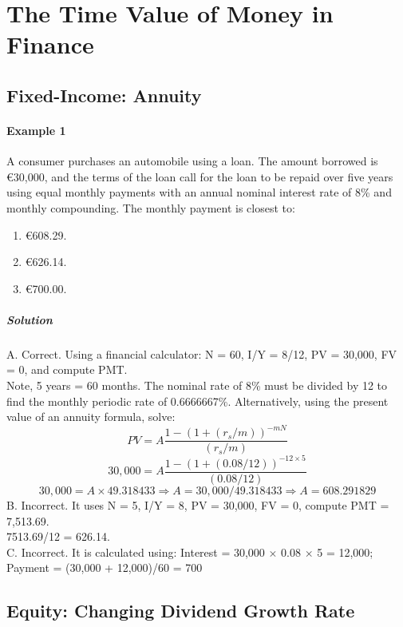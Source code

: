 \section{The Time Value of Money in Finance}
\label{sec:The Time Value of Money in Finance}
\subsection{Fixed-Income: Annuity} %
\paragraph{Example 1} %
A consumer purchases an automobile using a loan. The amount borrowed is €30,000, and the terms of the loan call for the loan to be repaid over five years using equal monthly payments with an annual nominal interest rate of 8\% and monthly compounding. The monthly payment is closest to:
\begin{enumerate}[label=\Alph*.]
	\item €608.29.
	\item €626.14.
	\item €700.00.
\end{enumerate}

\subparagraph{Solution} %
A. Correct. Using a financial calculator: N = 60, I/Y = 8/12, PV = 30,000, FV = 0, and compute PMT.\\
Note, 5 years = 60 months. The nominal rate of 8\% must be divided by 12 to find the monthly periodic rate of 0.6666667\%. Alternatively, using the present value of an annuity formula, solve:
\[
PV = A \frac{1 - (1 + (r_s/m))^{-mN}}{(r_s/m)}
\]
\[
30,000 = A \frac{1 - (1 + (0.08/12))^{-12 \times 5}}{(0.08/12)}
\]
\[30,000 = A \times 49.318433 \Rightarrow A = 30,000/49.318433 \Rightarrow A = 608.291829\]
B. Incorrect. It uses N = 5, I/Y = 8, PV = 30,000, FV = 0, compute PMT = 7,513.69.\\
7513.69/12 = 626.14.\\
C. Incorrect. It is calculated using: Interest = \texteuro{}30,000 $\times$ 0.08 $\times$ 5 = \texteuro{}12,000; Payment = (\texteuro{}30,000 + \texteuro{}12,000)/60 = \texteuro{}700

\subsection{Equity: Changing Dividend Growth Rate} %
